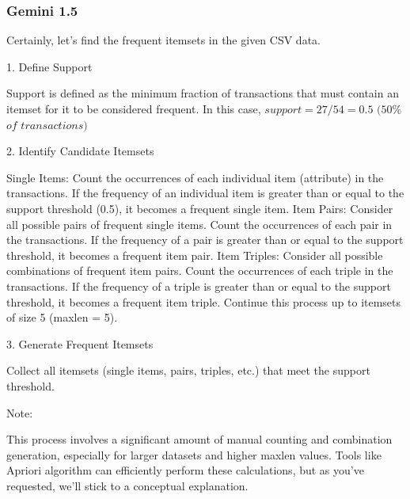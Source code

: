 \documentclass[12pt]{article}
\begin{document}
\newpage

\subsubsection{Gemini 1.5}

\begin{mdframed}

Certainly, let's find the frequent itemsets in the given CSV data.
\newline

1. Define Support
\newline

    Support is defined as the minimum fraction of transactions that must contain an itemset for it to be considered frequent.
    In this case, $support = 27/54 = 0.5$ $(50\%$ $ of$  $transactions)$
\newline

2. Identify Candidate Itemsets
\newline

    Single Items: Count the occurrences of each individual item (attribute) in the transactions.
        If the frequency of an individual item is greater than or equal to the support threshold (0.5), it becomes a frequent single item.
    Item Pairs:
        Consider all possible pairs of frequent single items.
        Count the occurrences of each pair in the transactions.
        If the frequency of a pair is greater than or equal to the support threshold, it becomes a frequent item pair.
    Item Triples:
        Consider all possible combinations of frequent item pairs.
        Count the occurrences of each triple in the transactions.
        If the frequency of a triple is greater than or equal to the support threshold, it becomes a frequent item triple.
    Continue this process up to itemsets of size 5 (maxlen = 5).
\newline

3. Generate Frequent Itemsets
\newline

    Collect all itemsets (single items, pairs, triples, etc.) that meet the support threshold.
\newline

Note:
\newline

    This process involves a significant amount of manual counting and combination generation, especially for larger datasets and higher maxlen values.
    Tools like Apriori algorithm can efficiently perform these calculations, but as you've requested, we'll stick to a conceptual explanation.
\newline


\end{mdframed}
\end{document}
